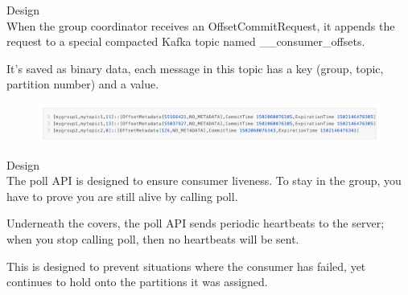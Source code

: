\begin{frame}[plain,t]{Design} %
     \\
    \vspace{2ex}
   When the group coordinator receives an OffsetCommitRequest, it appends the request to a special compacted Kafka topic named \_\_consumer\_offsets.
   
   \vspace{2ex}
   It’s saved as binary data, each message in this topic has a key (group, topic, partition number) and a value.
   
    \vspace{2ex}
   
   \begin{figure}
       \centering
       \includegraphics[width=1\linewidth]{image/0219}
       \label{fig:0219}
   \end{figure}
    
\end{frame}
\begin{frame}[plain,t]{Design} %
         \\
        \vspace{2ex}
        The poll API is designed to ensure consumer liveness. To stay in the group, you have to prove you are still alive by calling poll.
        
        \vspace{2ex}
        Underneath the covers, the poll API sends periodic heartbeats to the server; when you stop calling poll, then no heartbeats will be sent.
        
         \vspace{2ex}
        This is designed to prevent situations where the consumer has failed, yet continues to hold onto the partitions it was assigned. 
        
        
        
\end{frame}
